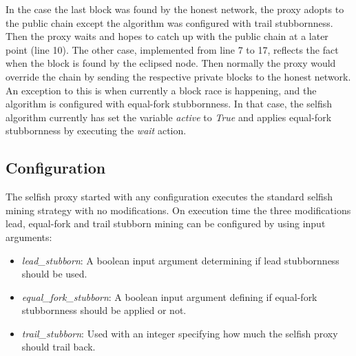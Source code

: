 In the case the last block was found by the honest network, the proxy adopts to the public chain except the algorithm was configured with trail stubbornness.
Then the proxy waits and hopes to catch up with the public chain at a later point (line 10).
The other case, implemented from line 7 to 17, reflects the fact when the block is found by the eclipsed node.
Then normally the proxy would override the chain by sending the respective private blocks to the honest network.
An exception to this is when currently a block race is happening, and the algorithm is configured with equal-fork stubbornness.
In that case, the selfish algorithm currently has set the variable \textit{active} to \textit{True} and applies equal-fork stubbornness by executing the \textit{wait} action.

\subsection{Configuration}

The selfish proxy started with any configuration executes the standard selfish mining strategy with no modifications.
On execution time the three modifications lead, equal-fork and trail stubborn mining can be configured by using input arguments:

\begin{itemize}
	\item \textit{lead\_stubborn}:
	A boolean input argument determining if lead stubbornness should be used. 
	\item \textit{equal\_fork\_stubborn}:
	A boolean input argument defining if equal-fork stubbornness should be applied or not.
	\item \textit{trail\_stubborn}:
	Used with an integer specifying how much the selfish proxy should trail back.
\end{itemize}
